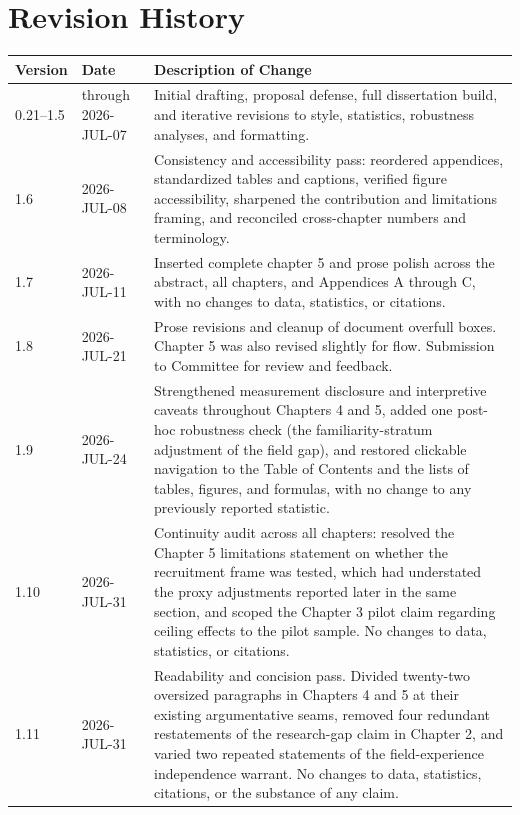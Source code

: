 \section{Revision History}
\begin{table}[H]
  \centering
  \begin{tabular}{@{}ll p{}@{}}
    \toprule
    \textbf{Version} & \textbf{Date} & \textbf{Description of Change}  \\
    \midrule
    0.21--1.5 & through 2026-JUL-07 & Initial drafting, proposal defense, full dissertation build, and iterative revisions to style, statistics, robustness analyses, and formatting.\\
    \midrule
    1.6 & 2026-JUL-08 & Consistency and accessibility pass: reordered appendices, standardized tables and captions, verified figure accessibility, sharpened the contribution and limitations framing, and reconciled cross-chapter numbers and terminology.\\
    \midrule
    1.7 & 2026-JUL-11 & Inserted complete chapter 5 and prose polish across the abstract, all chapters, and Appendices A through C, with no changes to data, statistics, or citations.\\
    \midrule
    1.8 & 2026-JUL-21 & Prose revisions and cleanup of document overfull boxes. Chapter 5 was also revised slightly for flow. Submission to Committee for review and feedback.\\
    \midrule
    1.9 & 2026-JUL-24 & Strengthened measurement disclosure and interpretive caveats throughout Chapters 4 and 5, added one post-hoc robustness check (the familiarity-stratum adjustment of the field gap), and restored clickable navigation to the Table of Contents and the lists of tables, figures, and formulas, with no change to any previously reported statistic.\\
    \midrule
    1.10 & 2026-JUL-31 & Continuity audit across all chapters: resolved the Chapter 5 limitations statement on whether the recruitment frame was tested, which had understated the proxy adjustments reported later in the same section, and scoped the Chapter 3 pilot claim regarding ceiling effects to the pilot sample. No changes to data, statistics, or citations.\\
    \midrule
    1.11 & 2026-JUL-31 & Readability and concision pass. Divided twenty-two oversized paragraphs in Chapters 4 and 5 at their existing argumentative seams, removed four redundant restatements of the research-gap claim in Chapter 2, and varied two repeated statements of the field-experience independence warrant. No changes to data, statistics, citations, or the substance of any claim.\\
    \bottomrule
  \end{tabular}
\end{table}
\clearpage
